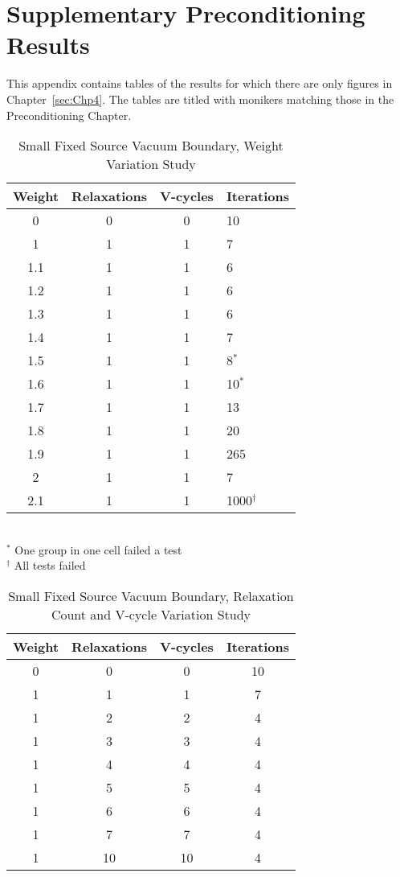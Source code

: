 
\chapter{Supplementary Preconditioning Results}
\label{sec:AppendixD}
This appendix contains tables of the results for which there are only figures in Chapter~\ref{sec:Chp4}. The tables are titled with monikers matching those in the Preconditioning Chapter. 

\begin{table}[!h]
\caption{Small Fixed Source Vacuum Boundary, Weight Variation Study}
\begin{center}
\begin{tabular}{c c c l}
\hline
Weight & Relaxations & V-cycles & Iterations \\[0.5ex]
\hline
0    & 0 & 0 & 10 \\
1    & 1 & 1 & 7 \\
1.1 & 1 & 1 & 6 \\
1.2 & 1 & 1 & 6 \\
1.3 & 1 & 1 & 6 \\
1.4 & 1 & 1 & 7 \\
1.5 & 1 & 1 & 8$^{*}$ \\
1.6 & 1 & 1 & 10$^{*}$ \\
1.7 & 1 & 1 & 13 \\
1.8 & 1 & 1 & 20 \\
1.9 & 1 & 1 & 265 \\
2    & 1 & 1 & 7 \\
2.1 & 1 & 1 & 1000$^{\dagger}$ \\
\hline 
\end{tabular} \\
$^{*}$ One group in one cell failed a test \\
$^{\dagger}$ All tests failed
\end{center}
\label{table:FxdSrcTstVacWeight}
\end{table}

\begin{table}[!h]
\caption{Small Fixed Source Vacuum Boundary, Relaxation Count and V-cycle Variation Study}
\begin{center}
\begin{tabular}{c c c c}
\hline
Weight & Relaxations & V-cycles & Iterations \\[0.5ex]
\hline
0  & 0 & 0 & 10 \\
1 & 1 & 1 & 7 \\
1 & 2 & 2 & 4 \\
1 & 3 & 3 & 4 \\
1 & 4 & 4 & 4 \\
1 & 5 & 5 & 4 \\
1 & 6 & 6 & 4 \\
1 & 7 & 7 & 4 \\
1 & 10 & 10 & 4 \\
\hline 
\end{tabular}
\end{center}
\label{table:FxdSrcTstVacRV}
\end{table}

